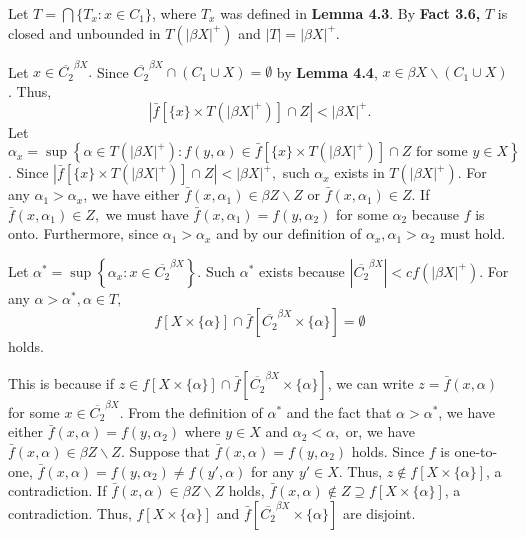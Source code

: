 \documentclass{article}
\begin{document}
\vskip 15pt
Let $T=\bigcap\{T_x:x\in C_1\}$, where $T_x$ was defined in \textbf{Lemma 4.3}. By \textbf{Fact 3.6,} $T$ is closed and unbounded in $T(|\beta X|^+)$ and $|T|=|\beta X|^+.$

\vskip 25pt

Let $x\in \overline{C_2}^{\beta X}.$ Since $\overline{C_2}^{\beta X}\cap (C_1\cup X)=\emptyset$ by \textbf{Lemma 4.4}, $x\in \beta X \backslash (C_1\cup X)$. Thus, $$\left|\bar{f}\left[ \{x\}\times T(|\beta X|^+) \right] \cap Z \right| < |\beta X|^+.$$ 
Let $\alpha_x=\sup\left\{ \alpha \in T(|\beta X|^+): f(y,\alpha)\in \bar{f}\left[ \{x\}\times T(|\beta X|^+) \right] \cap Z \mbox{ for some } y\in X\right\}$. Since   $\left|\bar{f}\left[ \{x\}\times T(|\beta X|^+) \right] \cap Z \right| < |\beta X|^+,$ such $\alpha_x$ exists in $T(|\beta X|^+)$. 
For any $\alpha_1 > \alpha_x$, we have either $\bar{f}(x,\alpha_1)\in \beta Z \backslash Z$ or $\bar{f}(x,\alpha_1)\in Z$. If $\bar{f}(x,\alpha_1)\in Z,$ we must have $\bar{f}(x,\alpha_1)=f(y,\alpha_2)$ for some $\alpha_2$ because $f$ is onto. Furthermore, since $\alpha_1>\alpha_x$ and by our definition of $\alpha_x, \alpha_1>\alpha_2$ must hold.
\vskip 15pt

Let $\alpha^* = \sup \left\{\alpha_x: x\in \overline{C_2}^{\beta X}\right\}.$ Such $\alpha^*$ exists because $\left| \overline{C_2}^{\beta X} \right| <cf(|\beta X|^+).$  For any $\alpha>\alpha^*, \alpha \in T,$
$$f\left[X\times \{\alpha\}\right] \cap \bar{f}\left[\overline{C_2}^{\beta X} \times \{\alpha\}\right] = \emptyset$$ holds. 

This is because if $z\in f\left[X\times \{\alpha\}\right] \cap \bar{f} \left[\overline{C_2}^{\beta X} \times \{\alpha\} \right]$, we can write $z=\bar{f}(x,\alpha)$ for some $x\in \overline{C_2}^{\beta X}$. From the definition of $\alpha^*$ and the fact that $\alpha>\alpha^*$, we have either $\bar{f}(x,\alpha)=f(y,\alpha_2)$ where $y\in X$ and $\alpha_2<\alpha,$ or, we have $\bar{f}(x,\alpha)\in \beta Z\backslash Z.$ Suppose that $\bar{f}(x,\alpha)=f(y,\alpha_2)$ holds. Since $f$ is one-to-one, $\bar{f}(x,\alpha)=f(y,\alpha_2)\neq f(y',\alpha)$ for any $y'\in X.$ Thus, $z\notin f\left[X\times \{\alpha\}\right] $, a contradiction. If $\bar{f}(x,\alpha)\in \beta Z\backslash Z$ holds, $\bar{f} (x,\alpha)\notin Z \supseteq f\left[X\times \{\alpha\}\right]$, a contradiction. Thus, $f\left[X\times \{\alpha\}\right] $ and $\bar{f}\left[\overline{C_2}^{\beta X} \times \{\alpha\}\right]$ are disjoint.

\vskip 25pt
\end{document}
